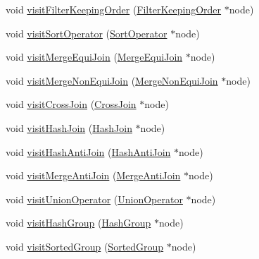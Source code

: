 \begin{DoxyCompactItemize}
\item 
void \hyperlink{class_bobox_plan_writing_physical_operator_visitor_a041f79a1705915af0d45e623ad7a18ac}{visit\+Filter\+Keeping\+Order} (\hyperlink{class_filter_keeping_order}{Filter\+Keeping\+Order} $\ast$node)
\item 
void \hyperlink{class_bobox_plan_writing_physical_operator_visitor_ac482fb6eae4e0bcb957bad6c572a2c03}{visit\+Sort\+Operator} (\hyperlink{class_sort_operator}{Sort\+Operator} $\ast$node)
\item 
void \hyperlink{class_bobox_plan_writing_physical_operator_visitor_ac66108bf441456b57aded81ac17b111b}{visit\+Merge\+Equi\+Join} (\hyperlink{class_merge_equi_join}{Merge\+Equi\+Join} $\ast$node)
\item 
void \hyperlink{class_bobox_plan_writing_physical_operator_visitor_a75a1a20aecd434d712dff1867bf5ec37}{visit\+Merge\+Non\+Equi\+Join} (\hyperlink{class_merge_non_equi_join}{Merge\+Non\+Equi\+Join} $\ast$node)
\item 
void \hyperlink{class_bobox_plan_writing_physical_operator_visitor_a882ad63c59098b1bca68fca5d36b8871}{visit\+Cross\+Join} (\hyperlink{class_cross_join}{Cross\+Join} $\ast$node)
\item 
void \hyperlink{class_bobox_plan_writing_physical_operator_visitor_a5616d43abbe0666c854342af2d3aec94}{visit\+Hash\+Join} (\hyperlink{class_hash_join}{Hash\+Join} $\ast$node)
\item 
void \hyperlink{class_bobox_plan_writing_physical_operator_visitor_a01ed46af47fc5c7fb7af2b6b5b2483ba}{visit\+Hash\+Anti\+Join} (\hyperlink{class_hash_anti_join}{Hash\+Anti\+Join} $\ast$node)
\item 
void \hyperlink{class_bobox_plan_writing_physical_operator_visitor_a0346b44be20be9fb68d95029908808f6}{visit\+Merge\+Anti\+Join} (\hyperlink{class_merge_anti_join}{Merge\+Anti\+Join} $\ast$node)
\item 
void \hyperlink{class_bobox_plan_writing_physical_operator_visitor_a87c2ddbe5d05b7dcc30c9d61d540d1f5}{visit\+Union\+Operator} (\hyperlink{class_union_operator}{Union\+Operator} $\ast$node)
\item 
void \hyperlink{class_bobox_plan_writing_physical_operator_visitor_a1e114b9a6e5bf08a691a9197f03efe9d}{visit\+Hash\+Group} (\hyperlink{class_hash_group}{Hash\+Group} $\ast$node)
\item 
void \hyperlink{class_bobox_plan_writing_physical_operator_visitor_a78d8526758ffeb3b335b8fc4a8a2defb}{visit\+Sorted\+Group} (\hyperlink{class_sorted_group}{Sorted\+Group} $\ast$node)
\item 

\end{DoxyCompactItemize}
